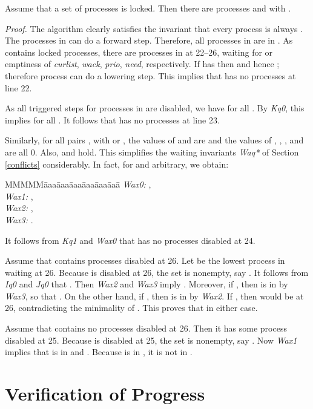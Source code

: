 \documentclass[10pt]{article} \usepackage[english]{babel}
\newenvironment{tab}{\begin{tabbing}
MMMMM\=aaa\=aaa\=aaa\=aaa\=aaa\=aaa\= \kill}{\end{tabbing}}
\newenvironment{proof}{\noindent\emph{Proof.}}{\boks}
\def\boks  {\mbox{}}
\def\S #1/{\mbox {\textsl{#1}}}
\begin{document}
\begin{theorem} \label{thm-no-deadlock} 
  Assume that a set  of processes is locked. Then there are
  processes  and  with .
\end{theorem}

\begin{proof}
  The algorithm clearly satisfies the invariant that every process is
  always . The processes in  can do a
  forward step. Therefore, all processes in  are in . As  contains locked processes, there are processes in 
  at 22--26, waiting for  or emptiness of \S curlist/,
  \S wack/, \S prio/, \S need/, respectively.  If  has  then  and hence ;
  therefore process  can do a lowering step.  This implies that 
  has no processes at line 22.

  As all triggered steps for processes in  are disabled, we have
   for all . By \S Kq0/, this implies  for all .  It follows that  has no processes at line 23. 

  Similarly, for all pairs ,  with  or , the
  values of  and  are  and the
  values of , , , and
   are all 0.  Also,  and  hold.  This simplifies the waiting invariants \S Waq*/ of
  Section \ref{conflicts} considerably. In fact, for  and 
  arbitrary, we obtain:
\begin{tab}
\S Wax0:/ \>  ,\\
\S Wax1:/ \>  ,\\
\S Wax2:/ \>  ,\\
\S Wax3:/ \>  .
\end{tab}
It follows from \S Kq1/ and \S Wax0/ that  has no processes
disabled at 24.

Assume that  contains processes disabled at 26. Let  be the
lowest process in  waiting at 26.  Because  is disabled at 26,
the set  is nonempty, say . It follows
from \S Iq0/ and \S Jq0/ that . Then \S Wax2/ and \S Wax3/
imply .  Moreover, if , then  is in 
by \S Wax3/, so that . On the other hand, if , then
 is in  by \S Wax2/. If , then  would be at
26, contradicting the minimality of . This proves that 
in either case.

Assume that  contains no processes disabled at 26. Then it has some
process  disabled at 25. Because  is disabled at 25, the
set  is nonempty, say . Now \S Wax1/
implies that  is in  and . Because  is
in , it is not in . 
\end{proof}

\section{Verification of Progress} \label{proofThm1}
\end{document}
